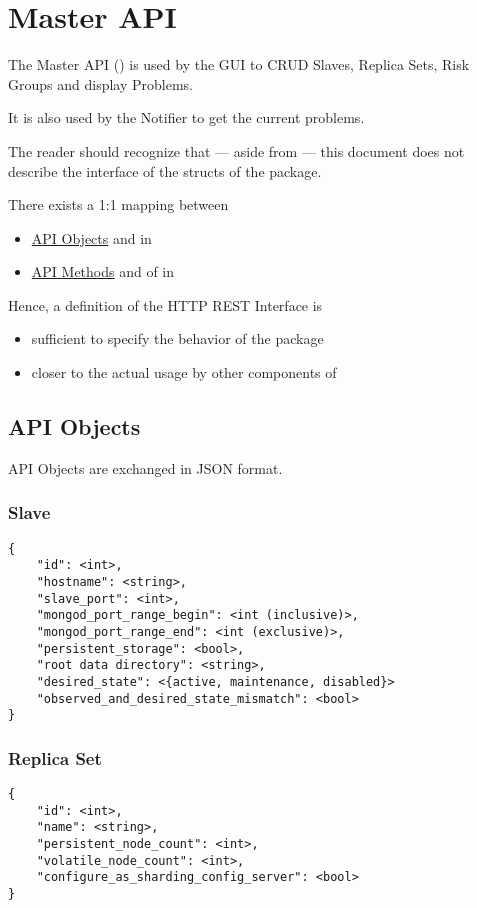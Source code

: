 \section{Master API}
The Master API () is used by the GUI to CRUD Slaves, Replica Sets, Risk Groups and display Problems.

It is also used by the Notifier to get the current problems.

The reader should recognize that --- aside from  --- this document does not describe the interface
of the structs of the package.

There exists a 1:1 mapping between
\begin{itemize}
  \item \hyperref[masterapi:apiobjects]{API Objects} and  in 
  \item \hyperref[masterapi:apimethods]{API Methods} and  of  in 
\end{itemize}

Hence, a definition of the HTTP REST Interface is
\begin{itemize}
  \item sufficient to specify the behavior of the  package
  \item closer to the actual usage by other components of \mamid
\end{itemize}

\subsection{API Objects} \label{masterapi:apiobjects}
API Objects are exchanged in JSON format.
\subsubsection{Slave}
\begin{lstlisting}
{
	"id": <int>,
	"hostname": <string>,
	"slave_port": <int>,
	"mongod_port_range_begin": <int (inclusive)>,
	"mongod_port_range_end": <int (exclusive)>,
	"persistent_storage": <bool>,
	"root data directory": <string>,
	"desired_state": <{active, maintenance, disabled}>
	"observed_and_desired_state_mismatch": <bool>
}
\end{lstlisting}
\subsubsection{Replica Set}
\begin{lstlisting}
{
	"id": <int>,
	"name": <string>,
	"persistent_node_count": <int>,
	"volatile_node_count": <int>,
	"configure_as_sharding_config_server": <bool>
}
\end{lstlisting}
